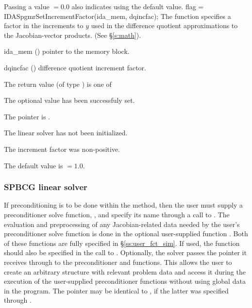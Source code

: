 {{  Passing a value $ = 0.0$ also indicates using the default value.
}
{
  flag = IDASpgmrSetIncrementFactor(ida\_mem, dqincfac);
}
{
  The function  specifies a factor in the 
  increments to $y$ used in the difference quotient approximations 
  to the Jacobian-vector products.  (See \S\ref{s:math}).
}
{
  \begin{args}[dqincfac]
  \item[ida\_mem] ()
    pointer to the {\ida} memory block.
  \item[dqincfac] ()
    difference quotient increment factor.
  \end{args}
}
{
  The return value  (of type ) is one of
  \begin{args}
  \item[\Id{IDASPGMR\_SUCCESS}] 
    The optional value has been successfuly set.
  \item[\Id{IDASPGMR\_MEM\_NULL}]
    The  pointer is .
  \item[\Id{IDASPGMR\_LMEM\_NULL}]
    The {\idaspgmr} linear solver has not been initialized.
  \item[\Id{IDASPGMR\_ILL\_INPUT}]
    The increment factor was non-positive.
  \end{args}
}
{
  The default value is  $=1.0$.
}
\subsubsection{SPBCG linear solver}\label{sss:optin_spbcg}
If preconditioning is to be done within the {\spbcg} method, then the user
must supply a preconditioner solve function, , and specify its
name through a call to .
The evaluation and preprocessing of any Jacobian-related data needed
by the user's preconditioner solve function is done in the optional
user-supplied function . Both of these functions are
fully specified in \S\ref{ss:user_fct_sim}.
If used, the  function should also be specified in the call to
.
Optionally, the {\idaspbcg} solver passes the pointer  it receives
through  to the preconditioner  and
 functions.  
This allows the user to create an arbitrary structure with relevant problem data 
and access it during the execution of the user-supplied preconditioner functions
without using global data in the program.  
The pointer  may be identical to , if the latter was 
specified through .

}

